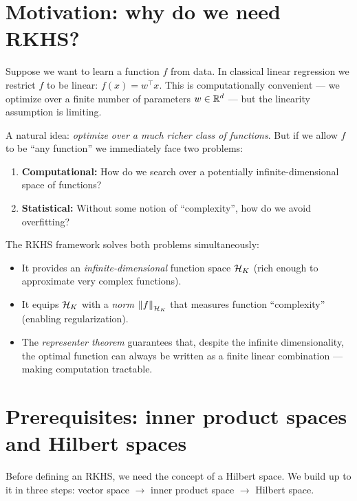 \begin{notechapter}
\section{Motivation: why do we need RKHS?}
\label{rkhs:sec:motivation}

Suppose we want to learn a function $f$ from data. In classical linear
regression we restrict $f$ to be linear: $f(x) = w^\top x$. This is
computationally convenient --- we optimize over a finite number of
parameters $w \in \mathbb{R}^d$ --- but the linearity assumption is limiting.

A natural idea: \emph{optimize over a much richer class of functions}.
But if we allow $f$ to be ``any function'' we immediately face two
problems:

\begin{enumerate}[label=\emph{(\arabic*)}]
  \item \textbf{Computational:} How do we search over a potentially
  infinite-dimensional space of functions?
  \item \textbf{Statistical:} Without some notion of ``complexity'', how
  do we avoid overfitting?
\end{enumerate}

The RKHS framework solves both problems simultaneously:
\begin{itemize}
  \item It provides an \emph{infinite-dimensional} function space
  $\mathcal{H}_K$ (rich enough to approximate very complex functions).
  \item It equips $\mathcal{H}_K$ with a \emph{norm} $\left\|f\right\|_{\mathcal{H}_K}$ that
  measures function ``complexity'' (enabling regularization).
  \item The \emph{representer theorem} guarantees that, despite the
  infinite dimensionality, the optimal function can always be written as
  a finite linear combination --- making computation tractable.
\end{itemize}




\section{Prerequisites: inner product spaces and Hilbert spaces}
\label{rkhs:sec:prereq}

Before defining an RKHS, we need the concept of a Hilbert space. We
build up to it in three steps: vector space $\to$ inner product space
$\to$ Hilbert space.


\end{notechapter}
